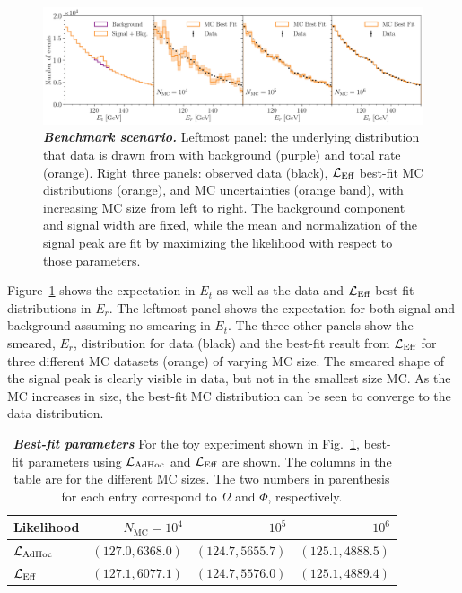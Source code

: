 \begin{figure}[htp]
\centering
    \includegraphics[width=1.\linewidth]{fig/fig4}
\caption{\textbf{\textit{Benchmark scenario.}} Leftmost panel: the underlying distribution that data is drawn from with background (purple) and total rate (orange).
Right three panels: observed data (black), $\mathcal{L}_\textmd{Eff}$ best-fit MC distributions (orange), and MC uncertainties (orange band), with increasing MC size from left to right.
The background component and signal width are fixed, while the mean and normalization of the signal peak are fit by maximizing the likelihood with respect to those parameters.}
\label{fig:toymc}
\end{figure}

Figure~\ref{fig:toymc} shows the expectation in $E_t$ as well as the data and $\mathcal{L}_\textmd{Eff}$ best-fit distributions in $E_r$.
The leftmost panel shows the expectation for both signal and background assuming no smearing in $E_t$.
The three other panels show the smeared, $E_r$, distribution for data (black) and the best-fit result from $\mathcal{L}_\textmd{Eff}$ for three different MC datasets (orange) of varying MC size.
The smeared shape of the signal peak is clearly visible in data, but not in the smallest size MC.
As the MC increases in size, the best-fit MC distribution can be seen to converge to the data distribution.

\begin{table}[htp]
\centering
\begin{tabular}{l r r r}
\toprule
Likelihood & $N_\mathrm{MC}=10^4$ & $10^5$ & $10^6$ \\
\midrule
$\mathcal{L}_{\textmd{AdHoc}}$ & $(127.0,6368.0)$ & $(124.7,5655.7)$ & $(125.1,4888.5)$ \\ \hline
$\mathcal{L}_\textmd{Eff}$ & $(127.1,6077.1)$ & $(124.7,5576.0)$ & $(125.1,4889.4)$ \\
\bottomrule
\end{tabular}
\caption{\textbf{\textit{Best-fit parameters}} For the toy experiment shown in Fig.~\ref{fig:toymc}, best-fit parameters using $\mathcal{L}_{\textmd{AdHoc}}$ and $\mathcal{L}_\textmd{Eff}$ are shown.
The columns in the table are for the different MC sizes.
The two numbers in parenthesis for each entry correspond to $\Omega$ and $\Phi$, respectively.}
\label{tbl:pointestimator}
\end{table}

